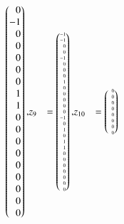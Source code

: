 \begin{beispiel}
{\begin{align*}
\begin{pmatrix*}[r]
 0\\
-1\\
 0\\
 0\\
 0\\
 0\\
 0\\
 1\\
 1\\
 0\\
 0\\
 0\\
 0\\
 0\\
 0\\
 0\\
 0\\
 0
\end{pmatrix*},
&z_9 %
&=
\tiny
\begin{pmatrix*}[r]
-1\\
-1\\
 0\\
 0\\
-1\\
 0\\
 0\\
 0\\
 1\\
 0\\
 0\\
 0\\
 0\\
 0\\
-1\\
 0\\
 1\\
 0\\
 1\\
 1\\
 0\\
 0\\
 0\\
 0\\
 0\\
 0\\
 0
\end{pmatrix*},
&z_{10} %
&=
\tiny
\begin{pmatrix*}[r]
\phantom{-}
 0\\
 0\\
 0\\
 0\\
 0\\ %
 0\\ 
 0\\
 0\\

\end{pmatrix*}
\end{align*}}
\end{beispiel}
